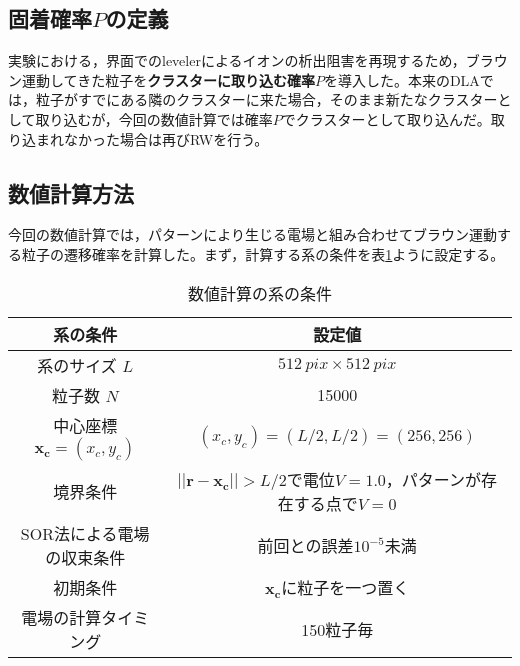 \documentclass[autodetect-engine,dvi=dvipdfmx,a4paper,ja=standard,oneside,openany,11pt,draft]{bxjsbook}
\begin{document}
\subsection{固着確率$P$の定義}
実験における，界面でのlevelerによるイオンの析出阻害を再現するため，ブラウン運動してきた粒子を\textbf{クラスターに取り込む確率$P$}を導入した。本来のDLAでは，粒子がすでにある隣のクラスターに来た場合，そのまま新たなクラスターとして取り込むが，今回の数値計算では確率$P$でクラスターとして取り込んだ。取り込まれなかった場合は再びRWを行う。
\subsection{数値計算方法}
今回の数値計算では，パターンにより生じる電場と組み合わせてブラウン運動する粒子の遷移確率を計算した。まず，計算する系の条件を表\ref{tab:condition}ように設定する。
\begin{table}[htbp]
  \centering
  \caption{数値計算の系の条件　}
  \begin{tabular}{|c||c|}
    \hline
    系の条件                      & 設定値                                                  \\ \hline\hline
    系のサイズ $L$                 & $\SI{512}{pix}\times\SI{512}{pix}$                   \\ \hline
    粒子数 $N$                   & 15000                                                \\ \hline
    中心座標 $\bm{x_c}=(x_c,y_c)$ & $(x_c,y_c)=(L/2,L/2)=(256,256)$                      \\ \hline
    境界条件                      & $||\bm{r}-\bm{x_c}||>L/2$で電位$V=1.0$，パターンが存在する点で$V=0$ \\ \hline
    SOR法による電場の収束条件            & 前回との誤差$10^{-5}$未満                                    \\ \hline
    初期条件                      & $\bm{x_c}$に粒子を一つ置く                                   \\ \hline
    電場の計算タイミング                & 150粒子毎                                               \\ \hline
  \end{tabular}
  \label{tab:condition}
\end{table}
\end{document}
